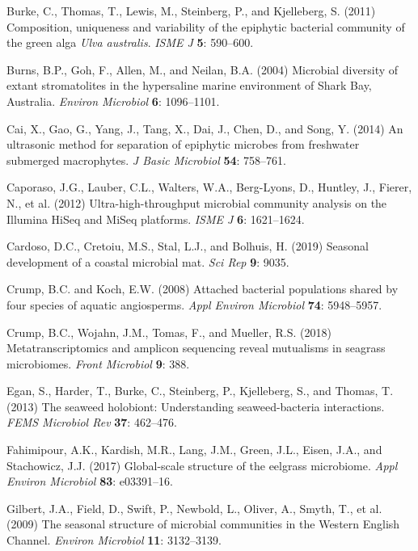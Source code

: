 \documentclass[12pt,]{article}
\begin{document}
\leavevmode\hypertarget{ref-Burke2011a}{}%
Burke, C., Thomas, T., Lewis, M., Steinberg, P., and Kjelleberg, S.
(2011) Composition, uniqueness and variability of the epiphytic
bacterial community of the green alga \emph{Ulva australis}. \emph{ISME
J} \textbf{5}: 590--600.

\leavevmode\hypertarget{ref-Burns2004}{}%
Burns, B.P., Goh, F., Allen, M., and Neilan, B.A. (2004) Microbial
diversity of extant stromatolites in the hypersaline marine environment
of Shark Bay, Australia. \emph{Environ Microbiol} \textbf{6}:
1096--1101.

\leavevmode\hypertarget{ref-Cai2014}{}%
Cai, X., Gao, G., Yang, J., Tang, X., Dai, J., Chen, D., and Song, Y.
(2014) An ultrasonic method for separation of epiphytic microbes from
freshwater submerged macrophytes. \emph{J Basic Microbiol} \textbf{54}:
758--761.

\leavevmode\hypertarget{ref-Caporaso2012}{}%
Caporaso, J.G., Lauber, C.L., Walters, W.A., Berg-Lyons, D., Huntley,
J., Fierer, N., et al. (2012) Ultra-high-throughput microbial community
analysis on the Illumina HiSeq and MiSeq platforms. \emph{ISME J}
\textbf{6}: 1621--1624.

\leavevmode\hypertarget{ref-Cardoso2019}{}%
Cardoso, D.C., Cretoiu, M.S., Stal, L.J., and Bolhuis, H. (2019)
Seasonal development of a coastal microbial mat. \emph{Sci Rep}
\textbf{9}: 9035.

\leavevmode\hypertarget{ref-Crump2008}{}%
Crump, B.C. and Koch, E.W. (2008) Attached bacterial populations shared
by four species of aquatic angiosperms. \emph{Appl Environ Microbiol}
\textbf{74}: 5948--5957.

\leavevmode\hypertarget{ref-Crump2018}{}%
Crump, B.C., Wojahn, J.M., Tomas, F., and Mueller, R.S. (2018)
Metatranscriptomics and amplicon sequencing reveal mutualisms in
seagrass microbiomes. \emph{Front Microbiol} \textbf{9}: 388.

\leavevmode\hypertarget{ref-Egan2013}{}%
Egan, S., Harder, T., Burke, C., Steinberg, P., Kjelleberg, S., and
Thomas, T. (2013) The seaweed holobiont: Understanding seaweed-bacteria
interactions. \emph{FEMS Microbiol Rev} \textbf{37}: 462--476.

\leavevmode\hypertarget{ref-Fahimipour2017}{}%
Fahimipour, A.K., Kardish, M.R., Lang, J.M., Green, J.L., Eisen, J.A.,
and Stachowicz, J.J. (2017) Global-scale structure of the eelgrass
microbiome. \emph{Appl Environ Microbiol} \textbf{83}: e03391--16.

\leavevmode\hypertarget{ref-Gilbert2009}{}%
Gilbert, J.A., Field, D., Swift, P., Newbold, L., Oliver, A., Smyth, T.,
et al. (2009) The seasonal structure of microbial communities in the
Western English Channel. \emph{Environ Microbiol} \textbf{11}:
3132--3139.
\end{document}

